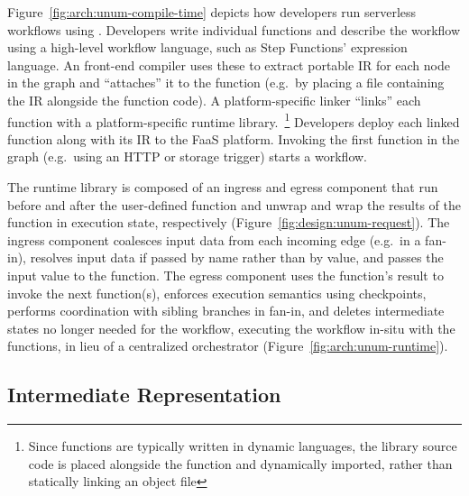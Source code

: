 Figure~\ref{fig:arch:unum-compile-time} depicts how developers run serverless
workflows using \name{}. Developers write individual functions and describe the
workflow using a high-level workflow language, such as Step Functions'
expression language. An \name{} front-end compiler uses these to extract
portable \name{} IR for each node in the graph and ``attaches'' it to the
function (e.g.\ by placing a file containing the IR alongside the function
code). A platform-specific \name{} linker ``links'' each function with a
platform-specific \name{} runtime library.~\footnote{Since functions are
typically written in dynamic languages, the \name{} library source code is
placed alongside the function and dynamically imported, rather than statically
linking an object file} Developers deploy each linked function along with its IR
to the FaaS platform.  Invoking the first function in the graph (e.g.\ using an
HTTP or storage trigger) starts a workflow.

The runtime library is composed of an ingress and egress component that run
before and after the user-defined function and unwrap and wrap the results of
the function in \name{} execution state, respectively
(Figure~\ref{fig:design:unum-request}). The ingress component coalesces input
data from each incoming edge (e.g.\ in a fan-in), resolves input data if passed
by name rather than by value, and passes the input value to the function. The
egress component uses the function's result to invoke the next function(s),
enforces execution semantics using checkpoints, performs coordination with
sibling branches in fan-in, and deletes intermediate states no longer needed for
the workflow, executing the workflow in-situ with the functions, in lieu of a
centralized orchestrator (Figure~\ref{fig:arch:unum-runtime}).



\subsection{\name{} Intermediate Representation}\label{sec:design:ir}

